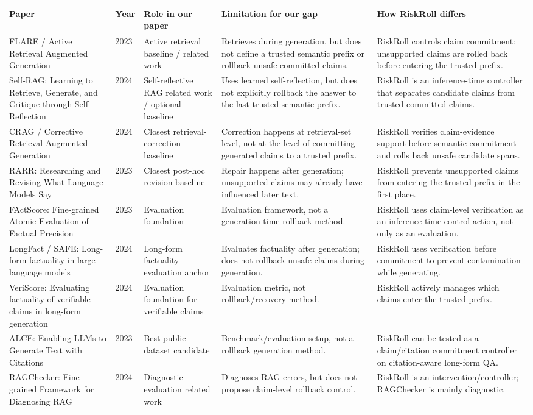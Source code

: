 \begin{tabular}{p{3.2cm}p{0.9cm}p{3.0cm}p{4.0cm}p{4.0cm}}
\toprule
Paper & Year & Role in our paper & Limitation for our gap & How RiskRoll differs \\
\midrule
FLARE / Active Retrieval Augmented Generation & 2023 & Active retrieval baseline / related work & Retrieves during generation, but does not define a trusted semantic prefix or rollback unsafe committed claims. & RiskRoll controls claim commitment: unsupported claims are rolled back before entering the trusted prefix. \\
Self-RAG: Learning to Retrieve, Generate, and Critique through Self-Reflection & 2024 & Self-reflective RAG related work / optional baseline & Uses learned self-reflection, but does not explicitly rollback the answer to the last trusted semantic prefix. & RiskRoll is an inference-time controller that separates candidate claims from trusted committed claims. \\
CRAG / Corrective Retrieval Augmented Generation & 2024 & Closest retrieval-correction baseline & Correction happens at retrieval-set level, not at the level of committing generated claims to a trusted prefix. & RiskRoll verifies claim-evidence support before semantic commitment and rolls back unsafe candidate spans. \\
RARR: Researching and Revising What Language Models Say & 2023 & Closest post-hoc revision baseline & Repair happens after generation; unsupported claims may already have influenced later text. & RiskRoll prevents unsupported claims from entering the trusted prefix in the first place. \\
FActScore: Fine-grained Atomic Evaluation of Factual Precision & 2023 & Evaluation foundation & Evaluation framework, not a generation-time rollback method. & RiskRoll uses claim-level verification as an inference-time control action, not only as an evaluation. \\
LongFact / SAFE: Long-form factuality in large language models & 2024 & Long-form factuality evaluation anchor & Evaluates factuality after generation; does not rollback unsafe claims during generation. & RiskRoll uses verification before commitment to prevent contamination while generating. \\
VeriScore: Evaluating factuality of verifiable claims in long-form generation & 2024 & Evaluation foundation for verifiable claims & Evaluation metric, not rollback/recovery method. & RiskRoll actively manages which claims enter the trusted prefix. \\
ALCE: Enabling LLMs to Generate Text with Citations & 2023 & Best public dataset candidate & Benchmark/evaluation setup, not a rollback generation method. & RiskRoll can be tested as a claim/citation commitment controller on citation-aware long-form QA. \\
RAGChecker: Fine-grained Framework for Diagnosing RAG & 2024 & Diagnostic evaluation related work & Diagnoses RAG errors, but does not propose claim-level rollback control. & RiskRoll is an intervention/controller; RAGChecker is mainly diagnostic. \\
\bottomrule
\end{tabular}